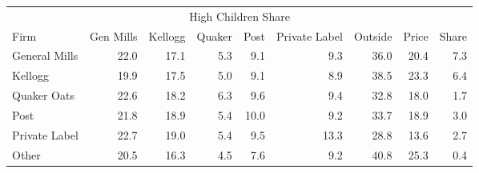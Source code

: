 \begin{tabular}{lrrrrrrrr}
\toprule
\multicolumn{9}{c}{High Children Share}\\
          Firm &  Gen Mills &  Kellogg &  Quaker &  Post &  Private Label &  Outside &  Price &  Share \\
\midrule
 General Mills &       22.0 &     17.1 &     5.3 &   9.1 &            9.3 &     36.0 &   20.4 &    7.3 \\
       Kellogg &       19.9 &     17.5 &     5.0 &   9.1 &            8.9 &     38.5 &   23.3 &    6.4 \\
   Quaker Oats &       22.6 &     18.2 &     6.3 &   9.6 &            9.4 &     32.8 &   18.0 &    1.7 \\
          Post &       21.8 &     18.9 &     5.4 &  10.0 &            9.2 &     33.7 &   18.9 &    3.0 \\
 Private Label &       22.7 &     19.0 &     5.4 &   9.5 &           13.3 &     28.8 &   13.6 &    2.7 \\
         Other &       20.5 &     16.3 &     4.5 &   7.6 &            9.2 &     40.8 &   25.3 &    0.4 \\
\bottomrule
\end{tabular}
